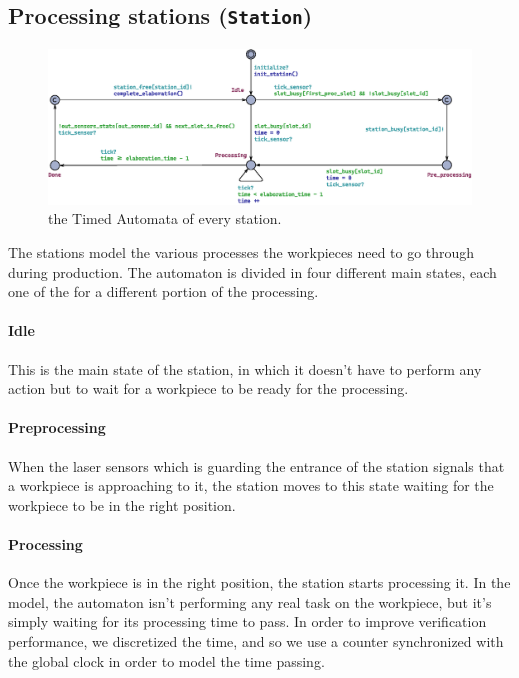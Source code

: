 \documentclass[a4paper]{article}
\begin{document}
    \subsection{Processing stations (\texttt{Station})}

    \begin{figure}[h!]
        \centering
        \includegraphics[width=0.84\columnwidth]{./images/automata/station}
        \caption{the Timed Automata of every station.}
    \end{figure}

    The stations model the various processes the workpieces need to go through during production. The automaton is divided in four different main states, each one of the for a different portion of the processing.

    \paragraph{Idle} This is the main state of the station, in which it doesn't have to perform any action but to wait for a workpiece to be ready for the processing.

    \paragraph{Preprocessing} When the laser sensors which is guarding the entrance of the station signals that a workpiece is approaching to it, the station moves to this state waiting for the workpiece to be in the right position.

    \paragraph{Processing} Once the workpiece is in the right position, the station starts processing it. In the model, the automaton isn't performing any real task on the workpiece, but it's simply waiting for its processing time to pass. In order to improve verification performance, we discretized the time, and so we use a counter synchronized with the global clock in order to model the time passing.
\end{document}
